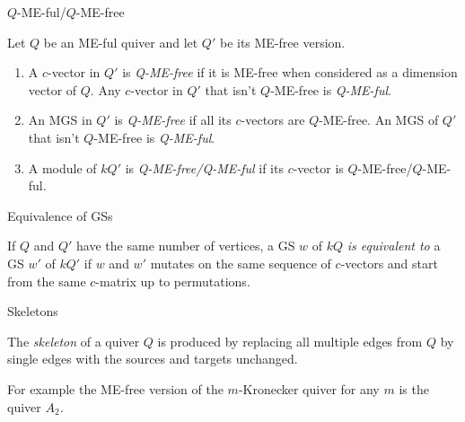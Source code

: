 \documentclass{beamer}
\begin{document}
\begin{frame}{$Q$-ME-ful/$Q$-ME-free}
\begin{definition}
Let $Q$ be an ME-ful quiver and let $Q'$ be its ME-free version.
\begin{enumerate}
\item A $c$-vector in $Q'$ is \textit{Q-ME-free} if it is ME-free when considered as a dimension vector of $Q$. Any $c$-vector in $Q'$ that isn't $Q$-ME-free is \textit{Q-ME-ful}.\pause
\item An MGS in $Q'$ is \textit{Q-ME-free} if all its $c$-vectors are $Q$-ME-free. An MGS of $Q'$ that isn't $Q$-ME-free is \textit{Q-ME-ful}.\pause
\item A module of $kQ'$ is \textit{Q-ME-free/Q-ME-ful} if its $c$-vector is $Q$-ME-free/$Q$-ME-ful.
\end{enumerate}
\end{definition}
\end{frame}

\begin{frame}{Equivalence of GSs}
\begin{definition}
If $Q$ and $Q'$ have the same number of vertices, a GS $w$ of $kQ$ \textit{is equivalent to} a GS $w'$ of $kQ'$ if $w$ and $w'$ mutates on the same sequence of $c$-vectors and start from the same $c$-matrix up to permutations. 
\end{definition}
\end{frame}

\begin{frame}{Skeletons}
\begin{definition}
The \textit{skeleton} of a quiver $Q$ is produced by replacing all multiple edges from $Q$ by single edges with the sources and targets unchanged.
\end{definition}
\indent For example the ME-free version of the $m$-Kronecker quiver for any $m$ is the quiver $A_2$.
\end{frame}
\end{document}
